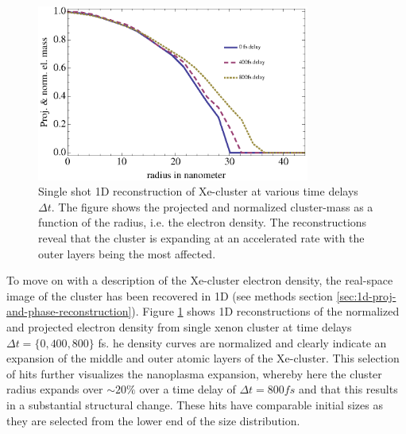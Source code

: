\begin{figure}
	\centering
		\includegraphics[width=0.80\textwidth]{images/results/Xe-reconstructions.eps}
	\caption[Single-shot 1D reconstruction of $\sim 30$ nm radius Xe-cluster]{Single shot 1D reconstruction of Xe-cluster at various time delays $\Delta t$. The figure shows the projected and normalized cluster-mass as a function of the radius, i.e. the electron density. The reconstructions reveal that the cluster is expanding at an accelerated rate with the outer layers being the most affected.}
	\label{fig:Xe-reconstructions}
\end{figure}
To move on with a description of the Xe-cluster electron density, the real-space image of the cluster has been recovered in 1D (see methods section \ref{sec:1d-proj-and-phase-reconstruction}). Figure \ref{fig:Xe-reconstructions} shows 1D reconstructions of the normalized and projected electron density from single xenon cluster at time delays $\Delta t=\{0, 400, 800\}$ fs. he density curves are normalized and clearly indicate an expansion of the middle and outer atomic layers of the Xe-cluster. This selection of hits further visualizes the nanoplasma expansion, whereby here the cluster radius expands over $\sim 20\%$ over a time delay of $\Delta t=800 fs$ and that this results in a substantial structural change. These hits have comparable initial sizes as they are selected from the lower end of the size distribution.\\
